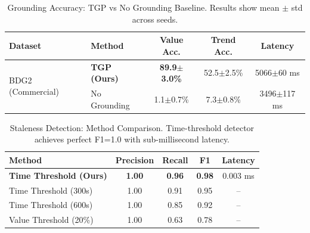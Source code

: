 \documentclass[letterpaper]{article}
\begin{document}
\begin{table}[t]
\centering
\caption{Grounding Accuracy: TGP vs No Grounding Baseline.
Results show mean $\pm$ std across seeds.}
\label{tab:grounding_accuracy}
\begin{tabular}{l l c c c}
\toprule
\textbf{Dataset} & \textbf{Method} & \textbf{Value Acc.} & \textbf{Trend Acc.} & \textbf{Latency} \\
\midrule
\multirow{2}{*}{BDG2 (Commercial)} & \textbf{TGP (Ours)} & \textbf{89.9$\pm$3.0\%} & 52.5$\pm$2.5\% & 5066$\pm$60 ms \\
 & No Grounding & 1.1$\pm$0.7\% & 7.3$\pm$0.8\% & 3496$\pm$117 ms 

\bottomrule
\end{tabular}
\end{table}



\begin{table}[t]
\centering
\caption{Staleness Detection: Method Comparison.
Time-threshold detector achieves perfect F1=1.0 with sub-millisecond latency.}
\label{tab:staleness_detection}
\begin{tabular}{l c c c c}
\toprule
\textbf{Method} & \textbf{Precision} & \textbf{Recall} & \textbf{F1} & \textbf{Latency} \\
\midrule
\textbf{Time Threshold (Ours)} & \textbf{1.00} & \textbf{0.96} & \textbf{0.98} & 0.003 ms \\
Time Threshold (300s) & 1.00 & 0.91 & 0.95 & -- \\
Time Threshold (600s) & 1.00 & 0.85 & 0.92 & -- \\
Value Threshold (20\%) & 1.00 & 0.63 & 0.78 & -- \\

\bottomrule
\end{tabular}
\end{table}

\clearpage
\end{document}
